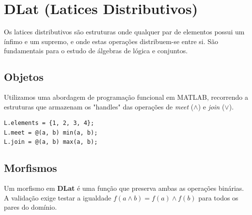 \section{DLat (Latices Distributivos)}

Os latices distributivos são estruturas onde qualquer par de elementos possui um ínfimo e um supremo, e onde estas operações distribuem-se entre si. São fundamentais para o estudo de álgebras de lógica e conjuntos.

\subsection{Objetos}
Utilizamos uma abordagem de programação funcional em MATLAB, recorrendo a estruturas que armazenam os "handles" das operações de \textit{meet} ($\wedge$) e \textit{join} ($\vee$).

\begin{lstlisting}[caption={Estrutura Funcional de Latice}]
L.elements = {1, 2, 3, 4}; 
L.meet = @(a, b) min(a, b); 
L.join = @(a, b) max(a, b); 
\end{lstlisting}

\subsection{Morfismos}
Um morfismo em \textbf{DLat} é uma função que preserva ambas as operações binárias. A validação exige testar a igualdade $f(a \wedge b) = f(a) \wedge f(b)$ para todos os pares do domínio.